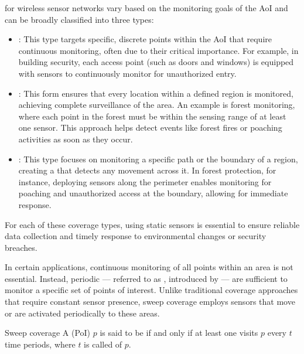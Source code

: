 \documentclass[a4paper, 12pt]{report}
\begin{document}
     for wireless sensor networks vary based on the monitoring goals of the AoI and can be broadly classified into three types:

    \begin{itemize}
        \item {}: This type targets specific, discrete points within the AoI that require continuous monitoring, often due to their critical importance. For example, in building security, each access point (such as doors and windows) is equipped with sensors to continuously monitor for unauthorized entry.
        \item {}: This form ensures that every location within a defined region is monitored, achieving complete surveillance of the area. An example is forest monitoring, where each point in the forest must be within the sensing range of at least one sensor. This approach helps detect events like forest fires or poaching activities as soon as they occur.
        \item {}: This type focuses on monitoring a specific path or the boundary of a region, creating a  that detects any movement across it. In forest protection, for instance, deploying sensors along the perimeter enables monitoring for poaching and unauthorized access at the boundary, allowing for immediate response.
    \end{itemize}

    For each of these coverage types,  using static sensors is essential to ensure reliable data collection and timely response to environmental changes or security breaches.

    In certain applications, continuous monitoring of all points within an area is not essential. Instead, periodic  --- referred to as , introduced by \textcite{cheng2} --- are sufficient to monitor a specific set of points of interest. Unlike traditional coverage approaches that require constant sensor presence, sweep coverage employs sensors that move or are activated periodically to  these areas. 

    \begin{frameddefn}{Sweep coverage}
        A  (PoI) $p$ is said to be  if and only if  at least one  visits $p$ every $t$ time periods, where $t$ is called  of $p$.
    \end{frameddefn}
\end{document}
